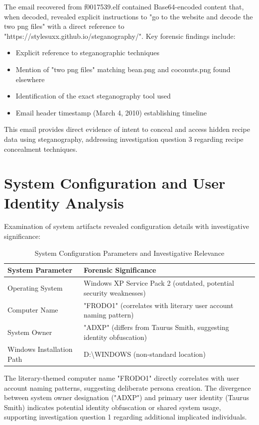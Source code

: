 The email recovered from f0017539.elf contained Base64-encoded content that, when decoded, revealed explicit instructions to "go to the website and decode the two png files" with a direct reference to "https://stylesuxx.github.io/steganography/". Key forensic findings include:

\begin{itemize}
    \item Explicit reference to steganographic techniques
    \item Mention of "two png files" matching bean.png and coconuts.png found elsewhere
    \item Identification of the exact steganography tool used
    \item Email header timestamp (March 4, 2010) establishing timeline
\end{itemize}

This email provides direct evidence of intent to conceal and access hidden recipe data using steganography, addressing investigation question 3 regarding recipe concealment techniques.

\section{System Configuration and User Identity Analysis}
Examination of system artifacts revealed configuration details with investigative significance:

\begin{table}[htbp]
\centering
\begin{tabular}{|p{5cm}|p{8.5cm}|}
\hline
\textbf{System Parameter} & \textbf{Forensic Significance} \\
\hline
Operating System & Windows XP Service Pack 2 (outdated, potential security weaknesses) \\
\hline
Computer Name & "FRODO1" (correlates with literary user account naming pattern) \\
\hline
System Owner & "ADXP" (differs from Taurus Smith, suggesting identity obfuscation) \\
\hline
Windows Installation Path & D:\textbackslash{}WINDOWS (non-standard location) \\
\hline
\end{tabular}
\caption{System Configuration Parameters and Investigative Relevance}
\label{table:system_config_significance}
\end{table}

The literary-themed computer name "FRODO1" directly correlates with user account naming patterns, suggesting deliberate persona creation. The divergence between system owner designation ("ADXP") and primary user identity (Taurus Smith) indicates potential identity obfuscation or shared system usage, supporting investigation question 1 regarding additional implicated individuals.